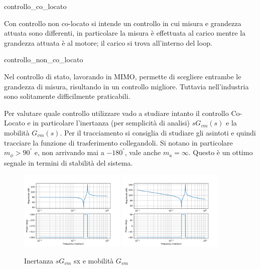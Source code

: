 {controllo_co_locato}

Con controllo non co-locato si intende un controllo in cui misura e grandezza attuata sono differenti, in particolare la misura è effettuata al carico mentre la grandezza attuata è al motore; il carico si trova all'interno del loop.

{controllo_non_co_locato}

Nel controllo di stato, lavorando in MIMO, permette di scegliere entrambe le grandezza di misura, risultando in un controllo migliore. Tuttavia nell'industria sono solitamente difficilmente praticabili. 

Per valutare quale controllo utilizzare vado a studiare intanto il controllo Co-Locato e in particolare l'inertanza (per semplicità di analisi) \(sG_{vm}(s)\) e la mobilità \(G_{vm}(s)\). Per il tracciamento si consiglia di studiare gli asintoti e quindi tracciare la funzione di trasferimento collegandoli.
Si notano in particolare \(m_\phi > 90^°\) e, non arrivando mai a \(-180^°\), vale anche \(m_a = \infty\). Questo è un ottimo segnale in termini di stabilità del sistema.

\begin{figure}[h]
    \centering
    \includegraphics[width=0.45\textwidth]{Immagini/Inertanza_gvm.png}
    \includegraphics[width=0.45\textwidth]{Immagini/mobilita_gvm.png}
    \caption{Inertanza \(sG_{vm}\) sx e mobilità \(G_{vm}\)}
\end{figure}

